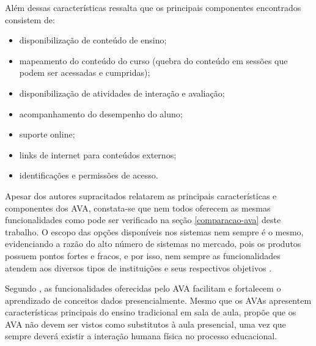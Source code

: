 Além dessas características  ressalta que os principais componentes encontrados consistem de:
\begin{itemize}
\item disponibilização de conteúdo de ensino;
\item mapeamento do conteúdo do curso (quebra do conteúdo em sessões que podem ser acessadas e cumpridas);
\item disponibilização de atividades de interação e avaliação;
\item acompanhamento do desempenho do aluno;
\item suporte online;
\item links de internet para conteúdos externos;
\item identificações e permissões de acesso.
\end{itemize}

Apesar dos autores supracitados relatarem as principais características e componentes dos AVA, constata-se que nem todos oferecem as mesmas funcionalidades como pode ser verificado na seção \ref{comparacao-ava} deste trabalho. O escopo das opções disponíveis nos sistemas nem sempre é o mesmo, evidenciando a razão do alto número de sistemas no mercado, pois os produtos possuem pontos fortes e fracos, e por isso, nem sempre as funcionalidades atendem aos diversos tipos de instituições e seus respectivos objetivos \cite{aguado2013dimensoes}.

Segundo , as funcionalidades oferecidas pelo AVA facilitam e fortalecem o aprendizado de conceitos dados presencialmente. Mesmo que os AVAs apresentem características principais do ensino tradicional em sala de aula,  propõe que os AVA não devem ser vistos como substitutos à aula presencial, uma vez que sempre deverá existir a interação humana física no processo educacional.


